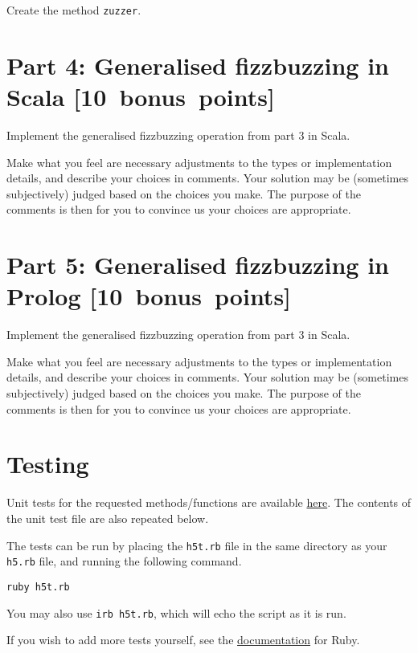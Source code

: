 \documentclass[11pt]{article}
\begin{document}
Create the method \texttt{zuzzer}.

\section*{Part 4: Generalised fizzbuzzing in Scala                [10 bonus points]}
\label{sec:orge68b313}
Implement the generalised fizzbuzzing operation from part 3 in Scala.

Make what you feel are necessary adjustments to the types or
implementation details, and describe your choices in comments.
Your solution may be (sometimes subjectively) judged based on
the choices you make. The purpose of the comments is then
for you to convince us your choices are appropriate.

\section*{Part 5: Generalised fizzbuzzing in Prolog               [10 bonus points]}
\label{sec:org2969a00}
Implement the generalised fizzbuzzing operation from part 3 in Scala.

Make what you feel are necessary adjustments to the types or
implementation details, and describe your choices in comments.
Your solution may be (sometimes subjectively) judged based on
the choices you make. The purpose of the comments is then
for you to convince us your choices are appropriate.

\section*{Testing}
\label{sec:org3b947f9}
Unit tests for the requested methods/functions
are available \href{./testing/h5/h5t.rb}{here}.
The contents of the unit test file are also repeated below.

The tests can be run by placing the \texttt{h5t.rb} file
in the same directory as your \texttt{h5.rb} file, and
running the following command.
\begin{verbatim}
ruby h5t.rb
\end{verbatim}
You may also use \texttt{irb h5t.rb}, which will echo the script
as it is run.

If you wish to add more tests yourself,
see the \href{https://en.wikibooks.org/wiki/Ruby\_Programming/Unit\_testing}{documentation}
for Ruby.
\end{document}
